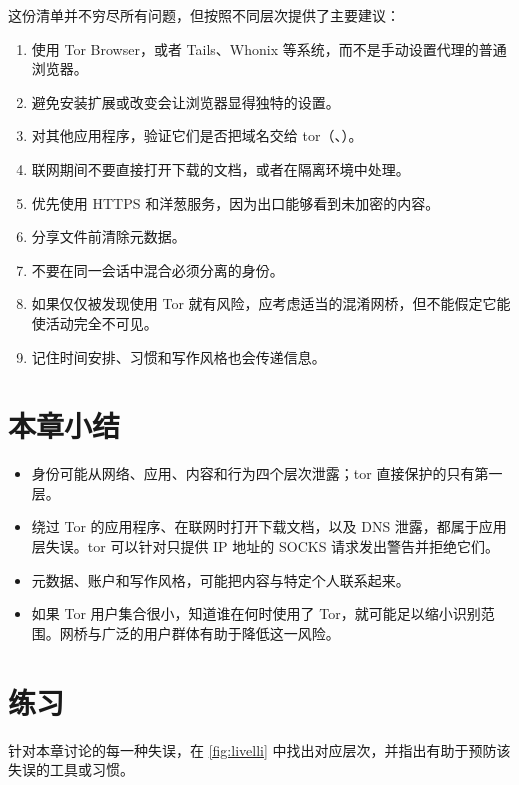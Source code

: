 这份清单并不穷尽所有问题，但按照不同层次提供了主要建议：
\begin{enumerate}
  \item 使用 Tor Browser，或者 Tails、Whonix 等系统，而不是手动设置代理的普通浏览器。
  \item 避免安装扩展或改变会让浏览器显得独特的设置。
  \item 对其他应用程序，验证它们是否把域名交给 tor（、）。
  \item 联网期间不要直接打开下载的文档，或者在隔离环境中处理。
  \item 优先使用 HTTPS 和洋葱服务，因为出口能够看到未加密的内容。
  \item 分享文件前清除元数据。
  \item 不要在同一会话中混合必须分离的身份。
  \item 如果仅仅被发现使用 Tor 就有风险，应考虑适当的混淆网桥，但不能假定它能使活动完全不可见。
  \item 记住时间安排、习惯和写作风格也会传递信息。
\end{enumerate}

\section*{本章小结}
\begin{itemize}
  \item 身份可能从网络、应用、内容和行为四个层次泄露；tor 直接保护的只有第一层。
  \item 绕过 Tor 的应用程序、在联网时打开下载文档，以及 DNS 泄露，都属于应用层失误。tor 可以针对只提供 IP 地址的 SOCKS 请求发出警告并拒绝它们。
  \item 元数据、账户和写作风格，可能把内容与特定个人联系起来。
  \item 如果 Tor 用户集合很小，知道谁在何时使用了 Tor，就可能足以缩小识别范围。网桥与广泛的用户群体有助于降低这一风险。
\end{itemize}

\section*{练习}

\begin{esercizio}[1]\label{es:28-livello}
针对本章讨论的每一种失误，在 \cref{fig:livelli} 中找出对应层次，并指出有助于预防该失误的工具或习惯。
\end{esercizio}


